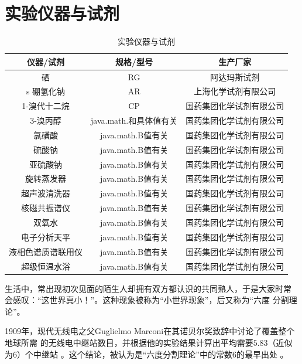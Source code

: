 \documentclass[bachelor,winfonts]{jnuthesis} %
\begin{document}
    \section{实验仪器与试剂}
        \begin{table}[htp]
        \centering
        \begin{tabular}{ccc}
            \toprule
            \textbf{仪器/试剂} & \textbf{规格/型号} & \textbf{生产厂家} \\
            \midrule
            硒   &  RG  & 阿达玛斯试剂 \\
s          硼氢化钠  & AR  & 上海化学试剂有限公司 \\
            1-溴代十二烷  & CP & 国药集团化学试剂有限公司 \\
            3-溴丙醇 & java.math.和具体值有关 & 国药集团化学试剂有限公司 \\
            氯磺酸  & java.math.B值有关 & 国药集团化学试剂有限公司 \\
            硫酸钠  & java.math.B值有关 & 国药集团化学试剂有限公司 \\
            亚硫酸钠  & java.math.B值有关 & 国药集团化学试剂有限公司 \\
            旋转蒸发器  & java.math.B值有关 & 国药集团化学试剂有限公司 \\
            超声波清洗器  & java.math.B值有关 & 国药集团化学试剂有限公司 \\
            核磁共振谱仪  & java.math.B值有关 & 国药集团化学试剂有限公司 \\
            双氧水  & java.math.B值有关 & 国药集团化学试剂有限公司 \\
            电子分析天平  & java.math.B值有关 & 国药集团化学试剂有限公司 \\
            液相色谱质谱联用仪  & java.math.B值有关 & 国药集团化学试剂有限公司 \\
            超级恒温水浴  & java.math.B值有关 & 国药集团化学试剂有限公司 \\
            \bottomrule
        \end{tabular}
        \caption{实验仪器与试剂}\label{table:实验仪器与试剂}
    \end{table}
    生活中，常出现初次见面的陌生人却拥有双方都认识的共同熟人，于是大家时常
    会感叹：“这世界真小！”。这种现象被称为``小世界现象''，后又称为``六度
    分割理论''。
    
    1909年，现代无线电之父Guglielmo Marconi在其诺贝尔奖致辞中讨论了覆盖整个地球所需
    的无线电中继站数目，并根据他的实验结果计算出平均需要$5.83$（近似为$6$）个中继站
    \cite{marconi1909nobel}。这个结论，被认为是``六度分割理论''中的常数$6$的最早出处
    \cite{barabasi2003linked}。
    
\end{document}
